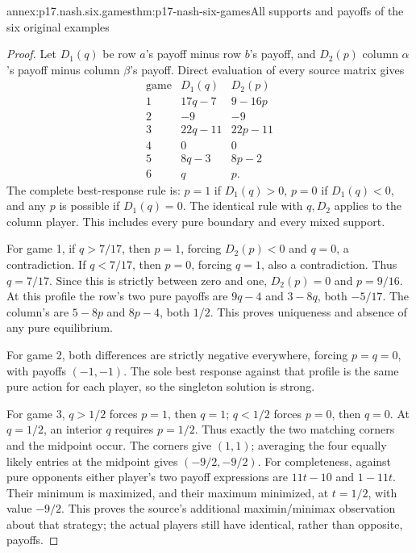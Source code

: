 \begin{annexitem}{annex:p17.nash.six.games}{thm:p17-nash-six-games}{All supports and payoffs of the six original examples}
\begin{proof}
Let \(D_1(q)\) be row \(a\)'s payoff
minus row \(b\)'s payoff, and \(D_2(p)\)
column \(\alpha\)'s payoff minus column
\(\beta\)'s payoff. Direct evaluation
of every source matrix gives
\[
\begin{array}{c|cc}
\text{game}&D_1(q)&D_2(p)\\ \hline
1&17q-7&9-16p\\
2&-9&-9\\
3&22q-11&22p-11\\
4&0&0\\
5&8q-3&8p-2\\
6&q&p.
\end{array}
\]
The complete best-response rule is:
\(p=1\) if \(D_1(q)>0\), \(p=0\)
if \(D_1(q)<0\), and any \(p\)
is possible if \(D_1(q)=0\).
The identical rule with \(q,D_2\)
applies to the column player.
This includes every pure boundary and
every mixed support.

For game 1, if \(q>7/17\), then
\(p=1\), forcing \(D_2(p)<0\)
and \(q=0\), a contradiction.
If \(q<7/17\), then \(p=0\),
forcing \(q=1\), also a contradiction.
Thus \(q=7/17\). Since this is
strictly between zero and one,
\(D_2(p)=0\) and \(p=9/16\).
At this profile the row's two
pure payoffs are \(9q-4\) and
\(3-8q\), both \(-5/17\).
The column's are \(5-8p\) and
\(8p-4\), both \(1/2\).
This proves uniqueness and absence
of any pure equilibrium.

For game 2, both differences are
strictly negative everywhere, forcing
\(p=q=0\), with payoffs \((-1,-1)\).
The sole best response against that
profile is the same pure action for
each player, so the singleton solution
is strong.

For game 3, \(q>1/2\) forces
\(p=1\), then \(q=1\); \(q<1/2\)
forces \(p=0\), then \(q=0\).
At \(q=1/2\), an interior \(q\)
requires \(p=1/2\).
Thus exactly the two matching corners
and the midpoint occur. The corners
give \((1,1)\); averaging the four
equally likely entries at the midpoint
gives \((-9/2,-9/2)\).
For completeness, against pure
opponents either player's two payoff
expressions are \(11t-10\) and
\(1-11t\). Their minimum is maximized,
and their maximum minimized, at
\(t=1/2\), with value \(-9/2\).
This proves the source's additional
maximin/minimax observation about that
strategy; the actual players still
have identical, rather than opposite,
payoffs.


\end{proof}
\end{annexitem}
